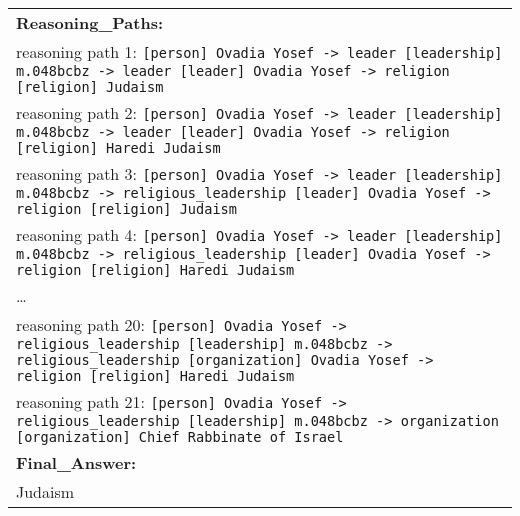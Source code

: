 \begin{table}[htbp]
\begin{tabular}{p{15cm}}
        \textbf{Reasoning\_Paths:} \\
        reasoning path 1: \texttt{[person] Ovadia Yosef ->  leader [leadership] m.048bcbz ->  leader [leader] Ovadia Yosef ->  religion [religion] Judaism} \\
        \vspace{2mm} %
        reasoning path 2: \texttt{[person] Ovadia Yosef ->  leader [leadership] m.048bcbz ->  leader [leader] Ovadia Yosef ->  religion [religion] Haredi Judaism} \\
        \vspace{2mm} %
        reasoning path 3: \texttt{[person] Ovadia Yosef ->  leader [leadership] m.048bcbz ->  religious\_leadership [leader] Ovadia Yosef ->  religion [religion] Judaism} \\
        \vspace{2mm} %
        reasoning path 4: \texttt{[person] Ovadia Yosef ->  leader [leadership] m.048bcbz ->  religious\_leadership [leader] Ovadia Yosef ->  religion [religion] Haredi Judaism} \\
        \dots \\
        reasoning path 20: \texttt{[person] Ovadia Yosef ->  religious\_leadership [leadership] m.048bcbz ->  religious\_leadership [organization] Ovadia Yosef ->  religion [religion] Haredi Judaism} \\
        \vspace{2mm} %
        reasoning path 21: \texttt{[person] Ovadia Yosef ->  religious\_leadership [leadership] m.048bcbz ->  organization [organization] Chief Rabbinate of Israel} \\
        \vspace{2mm} %

        \textbf{Final\_Answer:} \\
        Judaism \\
        \bottomrule
    \end{tabular}
\end{table}
